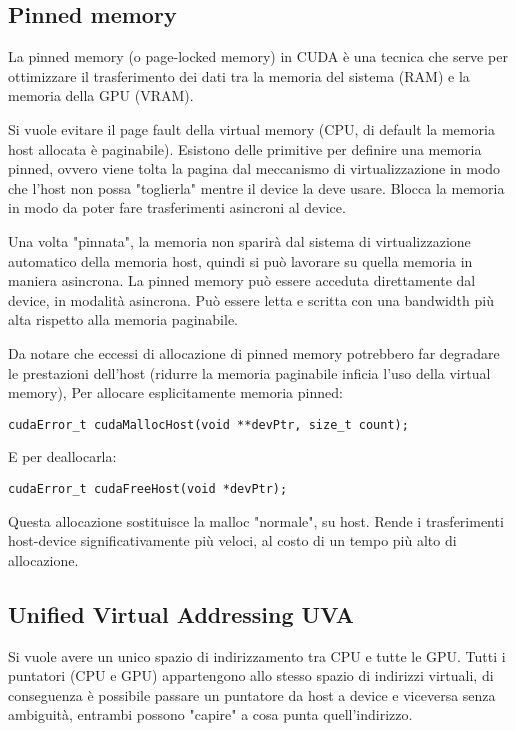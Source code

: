 \subsection{Pinned memory}
La pinned memory (o page-locked memory) in CUDA è una tecnica che serve per ottimizzare il trasferimento dei dati tra la memoria del sistema (RAM) e la memoria della GPU (VRAM). 

Si vuole evitare il page fault della virtual memory (CPU, di default la memoria host allocata è paginabile). Esistono delle primitive per definire una memoria pinned, ovvero viene tolta la pagina dal meccanismo di virtualizzazione in modo che l'host non possa "toglierla" mentre il device la deve usare. Blocca la memoria in modo da poter fare trasferimenti asincroni al device.

Una volta "pinnata", la memoria non sparirà dal sistema di virtualizzazione automatico della memoria host, quindi si può lavorare su quella memoria in maniera asincrona. La pinned memory può essere acceduta direttamente dal device, in modalità asincrona. Può essere letta e scritta con una bandwidth più alta rispetto alla memoria paginabile.

Da notare che eccessi di allocazione di pinned memory potrebbero far degradare le prestazioni dell'host (ridurre la memoria paginabile inficia l'uso della virtual memory), Per allocare esplicitamente memoria pinned:
\begin{lstlisting}
cudaError_t cudaMallocHost(void **devPtr, size_t count);
\end{lstlisting}

E per deallocarla:
\begin{lstlisting}
cudaError_t cudaFreeHost(void *devPtr);
\end{lstlisting}

Questa allocazione sostituisce la malloc "normale", su host. Rende i trasferimenti host-device significativamente più veloci, al costo di un tempo più alto di allocazione.

\subsection{Unified Virtual Addressing UVA}

Si vuole avere un unico spazio di indirizzamento tra CPU e tutte le GPU. Tutti i puntatori (CPU e GPU) appartengono allo stesso spazio di indirizzi virtuali, di conseguenza è possibile passare un puntatore da host a device e viceversa senza ambiguità, entrambi possono "capire" a cosa punta quell'indirizzo.

